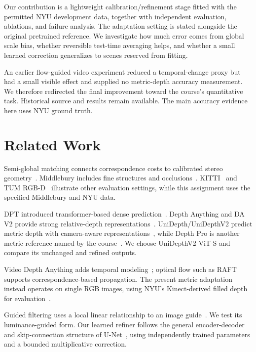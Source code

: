 \documentclass[10pt,twocolumn,letterpaper]{article}
\begin{document}
Our contribution is a lightweight calibration/refinement stage fitted with the permitted NYU development data, together with independent evaluation, ablations, and failure analysis. The adaptation setting is stated alongside the original pretrained reference. We investigate how much error comes from global scale bias, whether reversible test-time averaging helps, and whether a small learned correction generalizes to scenes reserved from fitting.

An earlier flow-guided video experiment reduced a temporal-change proxy but had a small visible effect and supplied no metric-depth accuracy measurement. We therefore redirected the final improvement toward the course's quantitative task. Historical source and results remain available. The main accuracy evidence here uses NYU ground truth.

\section{Related Work}
Semi-global matching connects correspondence costs to calibrated stereo geometry~\cite{hirschmuller2008}. Middlebury includes fine structures and occlusions~\cite{scharstein2014}. KITTI~\cite{geiger2012} and TUM RGB-D~\cite{sturm2012} illustrate other evaluation settings, while this assignment uses the specified Middlebury and NYU data.

DPT introduced transformer-based dense prediction~\cite{ranftl2021}. Depth Anything and DA V2 provide strong relative-depth representations~\cite{yang2024da,yang2024dav2}. UniDepth/UniDepthV2 predict metric depth with camera-aware representations~\cite{piccinelli2024,piccinelli2025}, while Depth Pro is another metric reference named by the course~\cite{bochkovskii2025}. We choose UniDepthV2 ViT-S and compare its unchanged and refined outputs.

Video Depth Anything adds temporal modeling~\cite{chen2025}; optical flow such as RAFT~\cite{teed2020} supports correspondence-based propagation. The present metric adaptation instead operates on single RGB images, using NYU's Kinect-derived filled depth for evaluation~\cite{silberman2012}.

Guided filtering uses a local linear relationship to an image guide~\cite{he2010guided}. We test its luminance-guided form. Our learned refiner follows the general encoder-decoder and skip-connection structure of U-Net~\cite{ronneberger2015unet}, using independently trained parameters and a bounded multiplicative correction.
\end{document}
